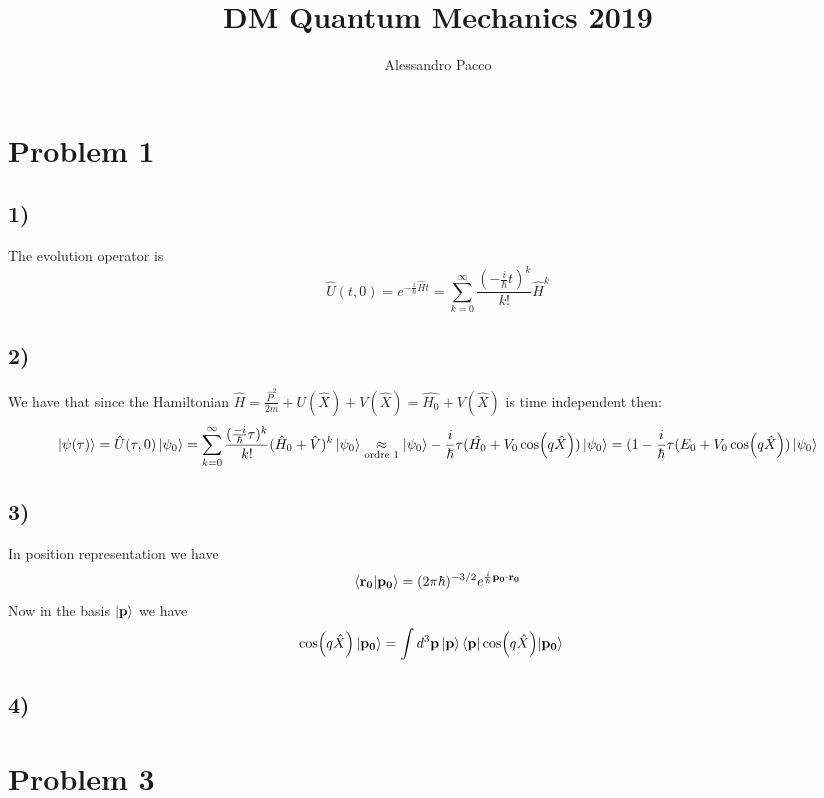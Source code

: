 \documentclass[10pt,a4paper]{book}
\author{Alessandro Pacco}
\title{DM Quantum Mechanics 2019}
\begin{document}
 
\maketitle

\section*{Problem 1}


\subsection*{1)}

The evolution operator is 
$$\hat{U}(t,0)=e^{-\frac{i}{\hbar}\hat{H}t}=\sum_{k=0}^{\infty} \frac{(-\frac{i}{\hbar}t)^k}{k!}\hat{H}^k$$


\subsection*{2)}

We have that since the Hamiltonian $\hat{H}=\frac{\hat{P}^2}{2m}+U(\hat{X})+V(\hat{X})=\hat{H_0}+V(\hat{X})$ is time independent then:
$$\ket{\psi(\tau)}=\hat{U}(\tau,0)\ket{\psi_0}=\sum_{k=0}^{\infty}\frac{(\frac{-i}{\hbar}\tau)^k}{k!}(\hat{H}_0+\hat{V})^k\ket{\psi_0}\underset{\text{ordre }1}{\approx} \ket{\psi_0}-\frac{i}{\hbar}\tau(\hat{H_0}+V_0\cos(q\hat{X}))\ket{\psi_0}=(1-\frac{i}{\hbar}\tau( E_0+V_0\cos(q\hat{X}))\ket{\psi_0}$$

\subsection*{3)}

In position representation we have 
$$\braket{\mathbf{r_0}|\mathbf{p_0}}=(2\pi \hbar)^{-3/2}e^{\frac{i}{\hbar}\mathbf{p_0}\cdot\mathbf{r_0}}$$
Now in the basis $\ket{\mathbf{p}}$ we have
\begin{align*}
\cos(q\hat{X})\ket{\mathbf{p_0}}&=
\int d^3\mathbf{p}\ket{\mathbf{p}}\braket{\mathbf{p}|\cos(q\hat{X})|\mathbf{p_0}}
\end{align*}


\subsection*{4)}



\section*{Problem 3}
\end{document}
